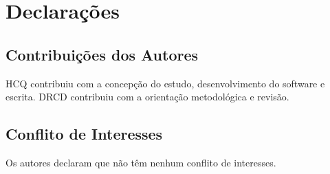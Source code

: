 \documentclass[a4paper, 10pt]{article}
\begin{document}
































\section*{Declarações}

\subsection*{Contribuições dos Autores}
HCQ contribuiu com a concepção do estudo, desenvolvimento do software e escrita. DRCD contribuiu com a orientação metodológica e revisão.

\subsection*{Conflito de Interesses}
Os autores declaram que não têm nenhum conflito de interesses.
\end{document}

